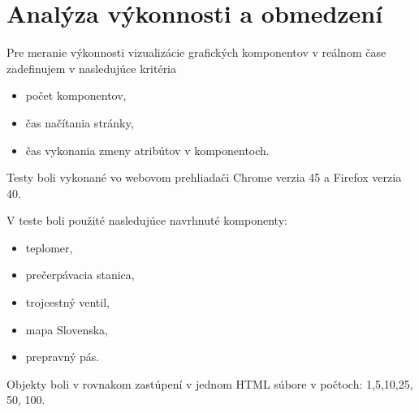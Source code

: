 \chapter{Analýza výkonnosti a obmedzení }
Pre meranie výkonnosti vizualizácie grafických komponentov v reálnom čase zadefinujem v nasledujúce kritéria
\begin{itemize}
	\item počet komponentov, 
	\item čas načítania stránky, 
	\item čas vykonania zmeny atribútov v komponentoch.
\end{itemize}

Testy boli vykonané vo webovom prehliadači Chrome verzia 45 a Firefox verzia 40.  

V teste boli použité nasledujúce navrhnuté komponenty:
\begin{itemize}
	\item teplomer, 
	\item prečerpávacia stanica, 
	\item trojcestný ventil, 
	\item mapa Slovenska, 
	\item prepravný pás. 
\end{itemize}

Objekty boli v rovnakom zastúpení v jednom HTML súbore  v počtoch: 1,5,10,25, 50, 100.


%
%
%
%
%
%
%
%
%
%
%
%
%
%
%
%
%
%
%
%
%
%
%
